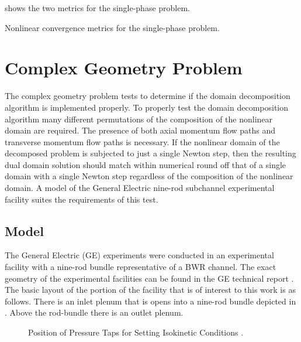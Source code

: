  shows the two metrics for the single-phase problem.

\begin{table}[h!t]
\centering
\singlespace

\caption{Nonlinear convergence metrics for the single-phase problem.}
\label{tab:singleMetric}
\end{table}

\section{Complex Geometry Problem}
\label{sect:complexProblem}
The complex geometry problem tests to determine if the domain decomposition algorithm is implemented properly.
To properly test the domain decomposition algorithm many different permutations of the composition of the nonlinear domain are required.
The presence of both axial momentum flow paths and transverse momentum flow paths is necessary.
If the nonlinear domain of the decomposed problem is subjected to just a single Newton step, then the resulting dual domain solution should match within numerical round off that of a single domain with a single Newton step regardless of the composition of the nonlinear domain.
A model of the General Electric nine-rod subchannel experimental facility \cite{Lahey1970} suites the requirements of this test.

\subsection{Model}
\label{sect:complexModel}

The General Electric (GE) experiments were conducted in an experimental facility with a nine-rod bundle representative of a BWR channel.
The exact geometry of the experimental facilities can be found in the GE technical report \cite{Lahey1970}.
The basic layout of the portion of the facility that is of interest to this work is as follows.
There is an inlet plenum that is opens into a nine-rod bundle depicted in .
Above the rod-bundle there is an outlet plenum.

\begin{figure}[ht]
\centering

\caption{Position of Pressure Taps for Setting Isokinetic Conditions \cite{Lahey1970}.}
\label{fig:channel_layout}
\end{figure}

